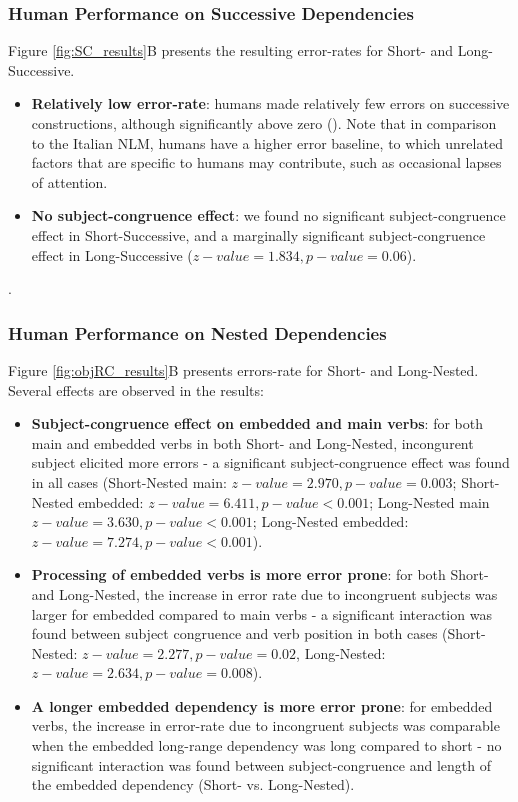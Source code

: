 \subsubsection{Human Performance on Successive Dependencies}
Figure \ref{fig:SC_results}B presents the resulting error-rates for Short- and Long-Successive. 
\begin{itemize}
    \item \textbf{Relatively low error-rate}: humans made relatively few errors on successive constructions, although significantly above zero (). Note that in comparison to the Italian NLM, humans have a higher error baseline, to which unrelated factors that are specific to humans may contribute, such as occasional lapses of attention.
    \item \textbf{No subject-congruence effect}: we found no significant subject-congruence effect in Short-Successive, and a marginally significant subject-congruence effect in Long-Successive ($z-value=1.834, p-value=0.06$).
\end{itemize}
.

\subsubsection{Human Performance on Nested Dependencies}
Figure \ref{fig:objRC_results}B presents errors-rate for Short- and Long-Nested. Several effects are observed in the results: 
\begin{itemize}
    \item \textbf{Subject-congruence effect on embedded and main verbs}: for both main and embedded verbs in both Short- and Long-Nested, incongurent subject elicited more errors - a significant subject-congruence effect was found in all cases (Short-Nested main: $z-value=2.970, p-value=0.003$; Short-Nested embedded: $z-value=6.411, p-value<0.001$; Long-Nested main $z-value=3.630, p-value<0.001$; Long-Nested embedded: $z-value=7.274, p-value<0.001$).
    \item \textbf{Processing of embedded verbs is more error prone}: for both Short- and Long-Nested, the increase in error rate due to incongruent subjects was larger for embedded compared to main verbs - a significant interaction was found between subject congruence and verb position in both cases (Short-Nested: $z-value=2.277, p-value = 0.02$, Long-Nested: $z-value=2.634, p-value = 0.008$).
    \item \textbf{A longer embedded dependency is more error prone}: for embedded verbs, the increase in error-rate due to incongruent subjects was comparable when the embedded long-range dependency was long compared to short - no significant interaction was found between subject-congruence and length of the embedded dependency (Short- vs. Long-Nested).
\end{itemize}

